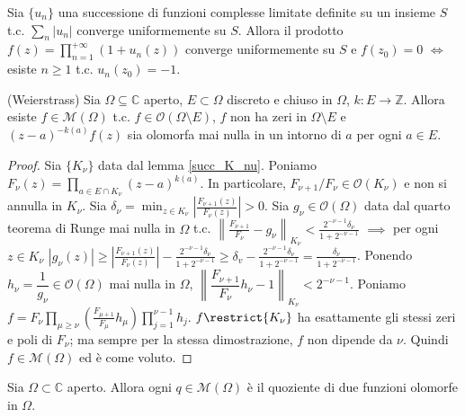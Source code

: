 \begin{exc}
  Sia $\{u_n\}$ una successione di funzioni complesse limitate definite su un insieme $S$ t.c. $\displaystyle \sum_{n} |u_n|$ converge uniformemente su $S$. Allora il prodotto $\displaystyle f(z)=\prod_{n=1}^{+\infty} (1+u_n(z))$ converge uniformemente su $S$ e $f(z_0)=0$ $\iff$ esiste $n \ge 1$ t.c. $u_n(z_0)=-1$.
\end{exc}

\begin{thm}
  (Weierstrass) Sia $\Omega \subseteq \mathbb{C}$ aperto, $E \subset \Omega$ discreto e chiuso in $\Omega$, $k:E \longrightarrow \mathbb{Z}$. Allora esiste $f \in \mathcal{M}(\Omega)$ t.c. $f \in \mathcal{O}(\Omega \setminus E)$, $f$ non ha zeri in $\Omega \setminus E$ e $(z-a)^{-k(a)}f(z)$ sia olomorfa mai nulla in un intorno di $a$ per ogni $a \in E$.
\end{thm}

\begin{proof}
  Sia $\{K_{\nu}\}$ data dal lemma \ref{succ_K_nu}. Poniamo $\displaystyle F_{\nu}(z)=\prod_{a \in E \cap K_{\nu}} (z-a)^{k(a)}$. In particolare, $F_{\nu+1}/F_{\nu} \in \mathcal{O}(K_{\nu})$ e non si annulla in $K_{\nu}$.
  Sia $\displaystyle \delta_{\nu}=\min_{z \in K_{\nu}} \left|\frac{F_{\nu+1}(z)}{F_{\nu}(z)}\right|>0$.
  Sia $g_{\nu} \in \mathcal{O}(\Omega)$ data dal quarto teorema di Runge mai nulla in $\Omega$ t.c. $\displaystyle \left\|\frac{F_{\nu+1}}{F_{\nu}}-g_{\nu}\right\|_{K_{\nu}}<\frac{2^{-\nu-1}\delta_{\nu}}{1+2^{-\nu-1}}$
  $\implies$ per ogni $z \in K_{\nu}$ $\displaystyle |g_{\nu}(z)| \ge \left|\frac{F_{\nu+1}(z)}{F_{\nu}(z)}\right|-\frac{2^{-\nu-1}\delta_{\nu}}{1+2^{-\nu-1}} \ge \delta_v-\frac{2^{-\nu-1}\delta_{\nu}}{1+2^{-\nu-1}}=\frac{\delta_{\nu}}{1+2^{-\nu-1}}$.
  Ponendo $h_{\nu}=\dfrac{1}{g_{\nu}} \in \mathcal{O}(\Omega)$ mai nulla in $\Omega$, $\left \|\dfrac{F_{\nu+1}}{F_{\nu}}h_{\nu}-1\right\|_{K_{\nu}}<2^{-\nu-1}$.
  Poniamo $\displaystyle f=F_{\nu}\prod_{\mu\ge\nu}\left(\frac{F_{\mu+1}}{F_{\mu}}h_{\mu}\right) \prod_{j=1}^{\nu-1}h_j$. $f\restrict{K_{\nu}}$ ha esattamente gli stessi zeri e poli di $F_{\nu}$; ma sempre per la stessa dimostrazione, $f$ non dipende da $\nu$. Quindi $f \in \mathcal{M}(\Omega)$ ed è come voluto.
\end{proof}

\begin{cor}
  Sia $\Omega \subset \mathbb{C}$ aperto. Allora ogni $q \in \mathcal{M}(\Omega)$ è il quoziente di due funzioni olomorfe in $\Omega$.
\end{cor}

